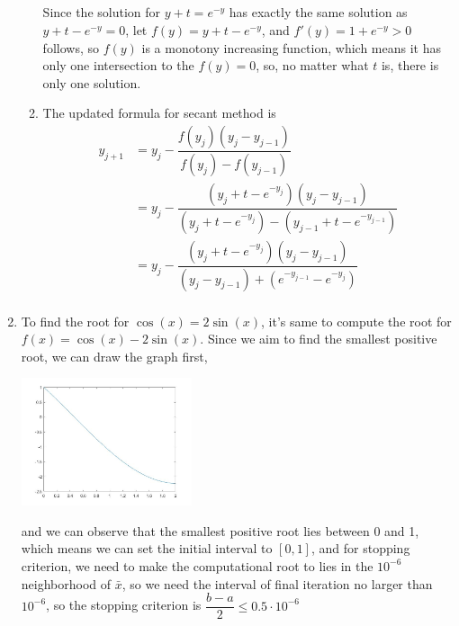 \documentclass{article}
\begin{document}
\begin{enumerate}
\begin{enumerate}
~\\


~\\


~\\


~\\


Since the solution for $y+t = e^{-y}$ has exactly the same solution as $y+t - e^{-y} =0$, let $f(y) = y+t - e^{-y}$, and $f'(y) =1+ e^{-y} >0$ follows, so $f(y)$ is a monotony increasing function, which means it has only one intersection to the $f(y) = 0$, so, no matter what $t$ is, there is only one solution.
\item
The updated formula for secant method is\begin{align*}
y_{j+1}&= y_j - \dfrac{f(y_j)(y_j-y_{j-1})}{f(y_j)-f(y_{j-1})}\\
&= y_j - \dfrac{(y_j+t - e^{-y_j})(y_j-y_{j-1})}{(y_j+t - e^{-y_j})-(y_{j-1}+t - e^{-y_{j-1}})}\\
&= y_j - \dfrac{(y_j+t - e^{-y_j})(y_j-y_{j-1})}{(y_j-y_{j-1}) +( e^{-y_{j-1}}-e^{-y_j})}\\
\end{align*}
\end{enumerate}
\item
To find the root for $\cos(x) =2\sin(x)$, it's same to compute the root for $f(x) = \cos(x) -2\sin(x)$.  Since we aim to find the smallest positive root, we can draw the graph first,
\begin{center}
\includegraphics[width=5cm]{4.jpg}
\end{center}

 and we can observe that the smallest positive root lies between 0 and 1, which means we can set the initial interval to $[0,1]$, and for stopping criterion, we need to make the computational root to lies in the $10^{-6}$ neighborhood of $\bar{x}$, so we need the interval of final iteration no larger than $ 10^{-6}$, so the stopping criterion is $\dfrac{b-a}{2} \leq 0.5 \cdot 10^{-6}$





\end{enumerate}
\end{document}
